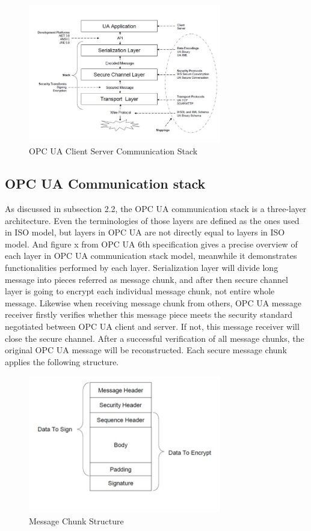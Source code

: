\documentclass[]{llncs}
\begin{document}
\begin{figure}[!htb]
	\centering
	\includegraphics[width=0.75\textwidth]{opc_ua_commstack.jpg}
		\caption[ ]{OPC UA Client Server Communication Stack}
	\label{fig:opc_ua_commstack}
\end{figure}

\subsection{OPC UA Communication stack}

As discussed in subsection 2.2, the OPC UA communication stack is a three-layer architecture. Even the terminologies of those layers are defined as the ones used in ISO model, but layers in OPC UA are not directly equal to layers in ISO model. And figure x from OPC UA  6th specification gives a precise overview of each layer in OPC UA communication stack model, meanwhile it demonstrates functionalities performed by each layer. Serialization layer will divide long message into pieces referred as message chunk, and after then secure channel layer is going to encrypt each individual message chunk, not entire whole message. Likewise when receiving message chunk from others, OPC UA message receiver firstly verifies whether this message piece meets the security standard negotiated between OPC UA client and server. If not, this message receiver will close the secure channel. After a successful verification of all message chunks, the original OPC UA message will be reconstructed. Each secure message chunk applies the following structure.  

\begin{figure}
	\centering
	\includegraphics[width=0.75\textwidth]{opc_ua_messchunk.jpg}
		\caption[ ]{Message Chunk Structure}
	\label{fig:opc_ua_messchunk}
\end{figure}
\end{document}
